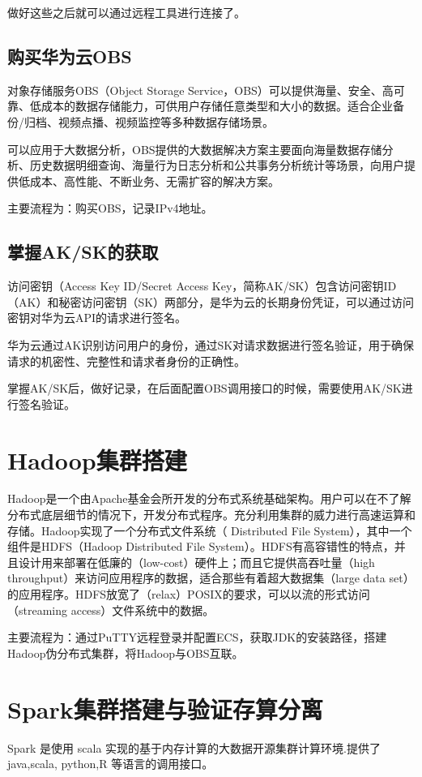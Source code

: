 \documentclass{../source/Experiment}
\begin{document}
        做好这些之后就可以通过远程工具进行连接了。

        \subsection{购买华为云OBS}

        对象存储服务OBS（Object Storage Service，OBS）可以提供海量、安全、高可靠、低成本的数据存储能力，可供用户存储任意类型和大小的数据。适合企业备份/归档、视频点播、视频监控等多种数据存储场景。

        可以应用于大数据分析，OBS提供的大数据解决方案主要面向海量数据存储分析、历史数据明细查询、海量行为日志分析和公共事务分析统计等场景，向用户提供低成本、高性能、不断业务、无需扩容的解决方案。

        主要流程为：购买OBS，记录IPv4地址。

        \subsection{掌握AK/SK的获取}
        
        访问密钥（Access Key ID/Secret Access Key，简称AK/SK）包含访问密钥ID（AK）和秘密访问密钥（SK）两部分，是华为云的长期身份凭证，可以通过访问密钥对华为云API的请求进行签名。

        华为云通过AK识别访问用户的身份，通过SK对请求数据进行签名验证，用于确保请求的机密性、完整性和请求者身份的正确性。

        掌握AK/SK后，做好记录，在后面配置OBS调用接口的时候，需要使用AK/SK进行签名验证。

    \section{Hadoop集群搭建}
        Hadoop是一个由Apache基金会所开发的分布式系统基础架构。用户可以在不了解分布式底层细节的情况下，开发分布式程序。充分利用集群的威力进行高速运算和存储。Hadoop实现了一个分布式文件系统（ Distributed File System），其中一个组件是HDFS（Hadoop Distributed File System）。HDFS有高容错性的特点，并且设计用来部署在低廉的（low-cost）硬件上；而且它提供高吞吐量（high throughput）来访问应用程序的数据，适合那些有着超大数据集（large data set）的应用程序。HDFS放宽了（relax）POSIX的要求，可以以流的形式访问（streaming access）文件系统中的数据。

        主要流程为：通过PuTTY远程登录并配置ECS，获取JDK的安装路径，搭建Hadoop伪分布式集群，将Hadoop与OBS互联。

    \section{Spark集群搭建与验证存算分离}
        Spark 是使用 scala 实现的基于内存计算的大数据开源集群计算环境.提供了 java,scala, python,R 等语言的调用接口。
\end{document}
